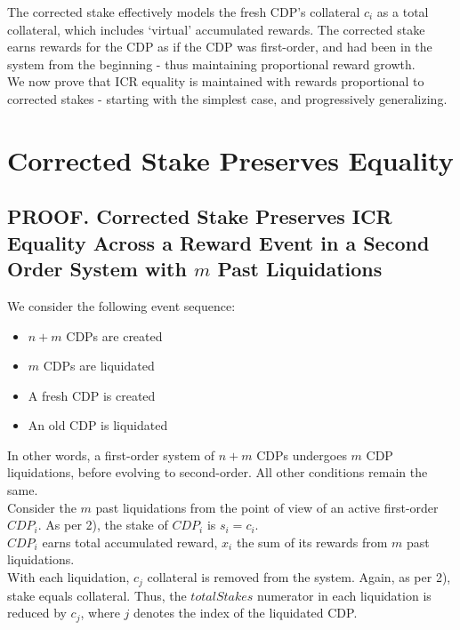 \documentclass[reqno]{article}
\begin{document}
The corrected stake effectively models the fresh CDP’s collateral $c_i$ as a total collateral, which includes ‘virtual’ accumulated rewards. The corrected stake earns rewards for the CDP as if the CDP was first-order, and had been in the system from the beginning - thus maintaining proportional reward growth.\\

We now prove that ICR equality is maintained with rewards proportional to corrected stakes - starting with the simplest case, and progressively generalizing.

\section{Corrected Stake Preserves Equality}

\subsection{PROOF. Corrected Stake Preserves ICR Equality Across a Reward Event in a Second Order System with $m$ Past Liquidations}

We consider the following event sequence:

\begin{itemize}
  \item $n+m$ CDPs are created
  \item $m$ CDPs are liquidated
  \item A fresh CDP is created
  \item An old CDP is liquidated
\end{itemize}

\bigskip
In other words, a first-order system of $n+m$ CDPs undergoes $m$ CDP liquidations, before evolving to second-order.  All other conditions remain the same.\\

Consider the $m$ past liquidations from the point of view of an active first-order $CDP_i$. As per 2), the stake of $CDP_i$ is $s_i = c_i$.\\

$CDP_i$ earns total accumulated reward, $x_i$  the sum of its rewards from $m$ past liquidations.\\

With each liquidation, $c_j$ collateral is removed from the system. Again, as per 2), stake equals collateral. Thus, the $totalStakes$ numerator in each liquidation is reduced by $c_j$, where $j$ denotes the index of the liquidated CDP.\\ 
\end{document}
